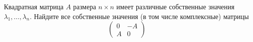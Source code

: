 \documentclass{article}
\begin{document}
Квадратная матрица $A$ размера $n\times n$ имеет различные собственные значения
$\lambda_1, \ldots, \lambda_n$. Найдите все собственные значения (в том числе комплексные) матрицы 
$$\begin{pmatrix}0&-A\\A&0\end{pmatrix}$$
\end{document}
